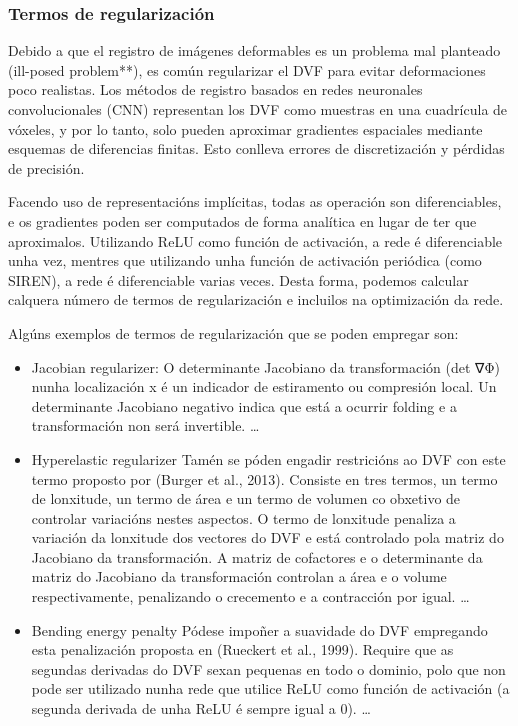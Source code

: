 \subsubsection{Termos de regularización}
\label{subsubsec:Termos de regularización}

Debido a que el registro de imágenes deformables es un problema mal planteado (ill-posed problem**), 
es común regularizar el DVF para evitar deformaciones poco realistas.
 Los métodos de registro basados en redes neuronales convolucionales (CNN) representan los DVF 
 como muestras en una cuadrícula de vóxeles, y por lo tanto, solo pueden aproximar gradientes espaciales
 mediante esquemas de diferencias finitas. Esto conlleva errores de discretización y pérdidas de precisión.

Facendo uso de representacións implícitas, todas as operación son diferenciables, e os gradientes poden
 ser computados de forma analítica en lugar de ter que aproximalos.
Utilizando ReLU como función de activación, a rede é diferenciable unha vez, mentres que utilizando
 unha función de activación periódica (como SIREN), a rede é diferenciable varias veces.
Desta forma, podemos calcular calquera número de termos de regularización e incluilos na optimización da rede.

Algúns exemplos de termos de regularización que se poden empregar son:
\begin{itemize}
    \item Jacobian regularizer: 
    O determinante Jacobiano da transformación (det ∇Φ) nunha localización x é un indicador de estiramento ou compresión local.
    Un determinante Jacobiano negativo indica que está a ocurrir folding e a transformación non será invertible.
    \dots

    \item Hyperelastic regularizer
    Tamén se póden engadir restricións ao DVF con este termo proposto por (Burger et al., 2013).
    Consiste en tres termos, un termo de lonxitude, un termo de área e un termo de volumen co obxetivo de controlar variacións nestes aspectos.
    O termo de lonxitude penaliza a variación da lonxitude dos vectores do DVF e está controlado pola matriz do Jacobiano da transformación.
    A matriz de cofactores e o determinante da matriz do Jacobiano da transformación controlan a área e o volume respectivamente, 
    penalizando o crecemento e a contracción por igual.
    \dots
    
    \item Bending energy penalty
    Pódese impoñer a suavidade do DVF empregando esta penalización proposta en (Rueckert et al., 1999).
    Require que as segundas derivadas do DVF sexan pequenas en todo o dominio, 
    polo que non pode ser utilizado nunha rede que utilice ReLU como función de activación (a segunda derivada de unha ReLU é sempre igual a 0).
    \dots
\end{itemize}